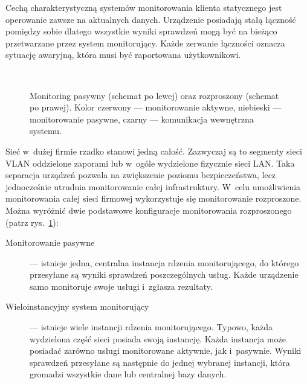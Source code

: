 Cechą charakterystyczną systemów monitorowania klienta statycznego
jest operowanie zawsze na aktualnych danych. Urządzenie posiadają
stałą łączność pomiędzy sobie dlatego wszystkie wyniki sprawdzeń mogą
być na bieżąco przetwarzane przez system monitorujący. Każde zerwanie
łączności oznacza sytuację awaryjną, która musi być raportowana
użytkownikowi.

\begin{figure}[ht]
  \caption{Monitoring pasywny (schemat po lewej) oraz rozproszony
    (schemat po prawej). Kolor czerwony --- monitorowanie aktywne,
    niebieski --- monitorowanie pasywne, czarny --- komunikacja wewnętrzna
    systemu.}
  \label{fig:PorPasIRozp}
\\[0.1cm]
\end{figure}

Sieć w~dużej firmie rzadko stanowi jedną całość. Zazwyczaj są to
segmenty sieci VLAN oddzielone zaporami lub w~ogóle wydzielone
fizycznie sieci LAN. Taka separacja urządzeń pozwala na zwiększenie
poziomu bezpieczeństwa, lecz jednocześnie utrudnia monitorowanie całej
infrastruktury. W~celu umożliwienia monitorowania całej sieci firmowej
wykorzystuje się monitorowanie rozproszone. Można wyróżnić dwie
podstawowe konfiguracje monitorowania rozproszonego (patrz
rys.~\ref{fig:PorPasIRozp}):

\begin{description}
\item[Monitorowanie pasywne] --- istnieje jedna, centralna instancja
  rdzenia monitorującego, do którego przesyłane są wyniki sprawdzeń
  poszczególnych usług. Każde urządzenie samo monitoruje swoje usługi
  i~zgłasza rezultaty.
\item[Wieloinstancyjny system monitorujący] --- istnieje wiele
  instancji rdzenia monitorującego. Typowo, każda wydzielona część
  sieci posiada swoją instancję. Każda instancja może posiadać zarówno
  usługi monitorowane aktywnie, jak i~pasywnie. Wyniki sprawdzeń
  przesyłane są następnie do jednej wybranej instancji, która gromadzi
  wszystkie dane lub centralnej bazy danych.
\end{description}


